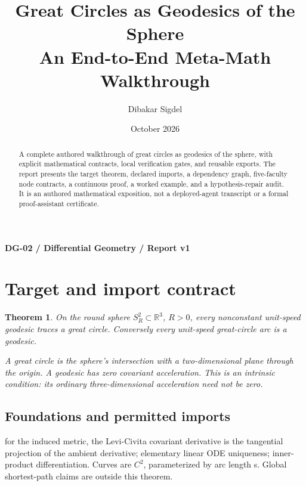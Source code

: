 \documentclass[preprint,12pt,aps,pra,showkeys,amsmath,amssymb,superscriptaddress,floatfix]{revtex4-2}
\newtheorem{theorem}{Theorem}[section]
\theoremstyle{definition}
\theoremstyle{remark}
\begin{document}
\title{Great Circles as Geodesics of the Sphere\\[4pt]\large An End-to-End Meta-Math Walkthrough}

\author{Dibakar Sigdel}


\date{October 2026}

\begin{abstract}

A complete authored walkthrough of great circles as geodesics of the
sphere, with explicit mathematical contracts, local verification gates,
and reusable exports. The report presents the target theorem, declared
imports, a dependency graph, five-faculty node contracts, a continuous
proof, a worked example, and a hypothesis-repair audit. It is an
authored mathematical exposition, not a deployed-agent transcript or a
formal proof-assistant certificate.

\end{abstract}\maketitle\linespread{1.12}\selectfont

\noindent\textbf{DG-02 / Differential Geometry / Report v1}

\section{Target and import contract}

\begin{theorem}

On the round sphere \(S_R^2\subset\mathbb R^3\), \(R>0\), every
nonconstant unit-speed geodesic traces a great circle. Conversely every
unit-speed great-circle arc is a geodesic.

A great circle is the sphere's intersection with a two-dimensional plane
through the origin. A geodesic has zero covariant acceleration. This is
an intrinsic condition: its ordinary three-dimensional acceleration need
not be zero.

\end{theorem}

\subsection{Foundations and permitted imports}

for the induced metric, the Levi-Civita covariant derivative is the
tangential projection of the ambient derivative; elementary linear ODE
uniqueness; inner-product differentiation. Curves are \(C^{2}\),
parameterized by arc length s. Global shortest-path claims are outside
this theorem.
\end{document}
